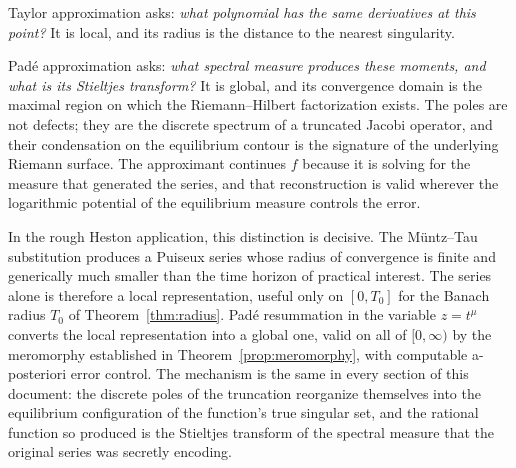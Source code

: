 \documentclass[11pt]{article}
\theoremstyle{definition}
\theoremstyle{remark}
\begin{document}
Taylor approximation asks: \emph{what polynomial has the same derivatives at this point?} It is local, and its radius is the distance to the nearest singularity.

Pad\'e approximation asks: \emph{what spectral measure produces these moments, and what is its Stieltjes transform?} It is global, and its convergence domain is the maximal region on which the Riemann--Hilbert factorization exists. The poles are not defects; they are the discrete spectrum of a truncated Jacobi operator, and their condensation on the equilibrium contour is the signature of the underlying Riemann surface. The approximant continues $f$ because it is solving for the measure that generated the series, and that reconstruction is valid wherever the logarithmic potential of the equilibrium measure controls the error.

In the rough Heston application, this distinction is decisive. The M\"untz--Tau substitution produces a Puiseux series whose radius of convergence is finite and generically much smaller than the time horizon of practical interest. The series alone is therefore a local representation, useful only on $[0,T_{0}]$ for the Banach radius $T_{0}$ of Theorem~\ref{thm:radius}. Pad\'e resummation in the variable $z=t^{\mu}$ converts the local representation into a global one, valid on all of $[0,\infty)$ by the meromorphy established in Theorem~\ref{prop:meromorphy}, with computable a-posteriori error control. The mechanism is the same in every section of this document: the discrete poles of the truncation reorganize themselves into the equilibrium configuration of the function's true singular set, and the rational function so produced is the Stieltjes transform of the spectral measure that the original series was secretly encoding.
\end{document}
